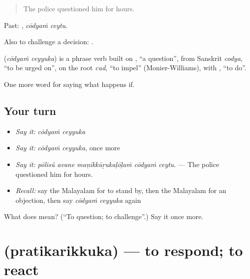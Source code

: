 \begin{quote}
The police questioned him for hours.
\end{quote}

Past:  , \emph{cōdyaṁ ceytu}.

Also to challenge a decision:   .

\begin{cousinweb}
\textbf{ } (\emph{cōdyaṁ ceyyuka}) is a phrase verb built on , \textquotedblleft{}a question\textquotedblright{}, from Sanskrit \emph{codya}, \textquotedblleft{}to be urged on\textquotedblright{}, on the root \emph{cud}, \textquotedblleft{}to impel\textquotedblright{} (Monier-Williams), with , \textquotedblleft{}to do\textquotedblright{}.
\end{cousinweb}

\begin{grammarlens}[title={What you've built}]
One more word for saying what happens if.
\end{grammarlens}

\subsection*{Your turn}
\begin{itemize}
\raggedright
  \item \emph{Say it:} \emph{cōdyaṁ ceyyuka}
  \item \emph{Say it:} \emph{cōdyaṁ ceyyuka}, once more
  \item \emph{Say it:} \emph{pōlīsŭ avane maṇikkūṟukaḷōḷaṁ cōdyaṁ ceytu.} — The police questioned him for hours.
  \item \emph{Recall:} say the Malayalam for to stand by, then the Malayalam for an objection, then say \emph{cōdyaṁ ceyyuka} again
\end{itemize}

\begin{tcolorbox}[breakable,colback=teal!4,colframe=teal!35!black,title={Before you move on}]
What does   mean? (\textquotedblleft{}To question; to challenge\textquotedblright{}.) Say it once more.
\end{tcolorbox}
\section[\texorpdfstring{\ml{പ്രതികരിക്കുക} (pratikarikkuka)}{പ്രതികരിക്കുക (pratikarikkuka)}]{ (pratikarikkuka) — to respond; to react}

